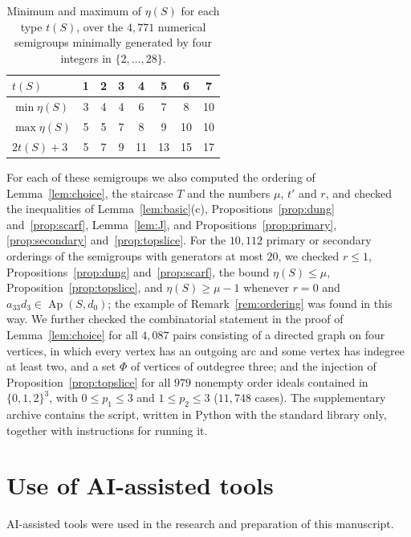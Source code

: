 \documentclass{amsart}
\theoremstyle{definition}
\theoremstyle{remark}
\numberwithin{equation}{section}
\newcommand{\Ap}{\operatorname{Ap}}
\newcommand{\Apd}{\Ap(S,d_0)}
\begin{document}
\begin{table}[ht]
\caption{Minimum and maximum of $\eta(S)$ for each type $t(S)$, over the $4{,}771$ numerical semigroups minimally generated by four integers in $\{2,\dots,28\}$.}\label{tab:range}
\begin{tabular}{lccccccc}
\toprule
$t(S)$ & 1 & 2 & 3 & 4 & 5 & 6 & 7\\
\midrule
$\min\eta(S)$ & 3 & 4 & 4 & 6 & 7 & 8 & 10\\
$\max\eta(S)$ & 5 & 5 & 7 & 8 & 9 & 10 & 10\\
$2t(S)+3$ & 5 & 7 & 9 & 11 & 13 & 15 & 17\\
\bottomrule
\end{tabular}
\end{table}

For each of these semigroups we also computed the ordering of Lemma~\ref{lem:choice}, the staircase $T$ and the numbers $\mu$, $t'$ and $r$, and checked the inequalities of Lemma~\ref{lem:basic}(c), Propositions~\ref{prop:dung} and~\ref{prop:scarf}, Lemma~\ref{lem:J}, and Propositions~\ref{prop:primary}, \ref{prop:secondary} and~\ref{prop:topslice}. For the $10{,}112$ primary or secondary orderings of the semigroups with generators at most $20$, we checked $r\le1$, Propositions~\ref{prop:dung} and~\ref{prop:scarf}, the bound $\eta(S)\le\mu$, Proposition~\ref{prop:topslice}, and $\eta(S)\ge\mu-1$ whenever $r=0$ and $a_{33}d_3\in\Apd$; the example of Remark~\ref{rem:ordering} was found in this way. We further checked the combinatorial statement in the proof of Lemma~\ref{lem:choice} for all $4{,}087$ pairs consisting of a directed graph on four vertices, in which every vertex has an outgoing arc and some vertex has indegree at least two, and a set $\Phi$ of vertices of outdegree three; and the injection of Proposition~\ref{prop:topslice} for all $979$ nonempty order ideals contained in $\{0,1,2\}^3$, with $0\le p_1\le3$ and $1\le p_2\le3$ ($11{,}748$ cases). The supplementary archive contains the script, written in Python with the standard library only, together with instructions for running it.

\section*{Use of AI-assisted tools}

AI-assisted tools were used in the research and preparation of this manuscript.
\end{document}
